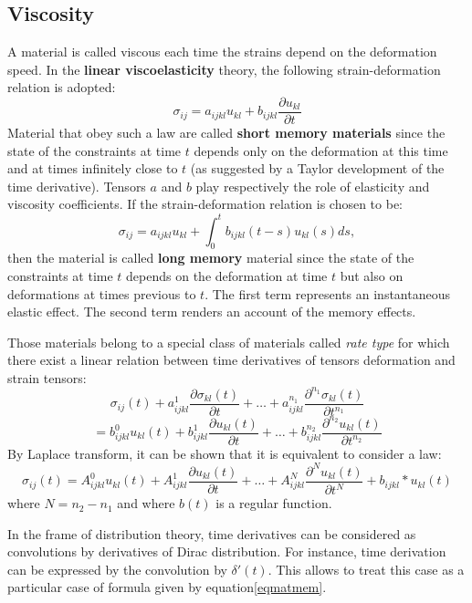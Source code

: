 \documentclass[12pt]{book}
\begin{document}
\subsection{Viscosity}
A material is called viscous
each time the strains depend
on the deformation speed. In the {\bf linear viscoelasticity}
theory\cite{ma:equad:Dautray1}, the following
strain-deformation relation is adopted:
\begin{equation}
\sigma_{ij}=a_{ijkl}u_{kl}+b_{ijkl}\frac{\partial u_{kl}}{\partial t}
\end{equation}
Material that obey such a law are called {\bf short memory
  materials}
since the state of the constraints at time $t$
depends only on the deformation at this time and at times infinitely close to
$t$ (as suggested by a Taylor development of the time derivative). Tensors $a$
and $b$ play respectively the role of elasticity and viscosity coefficients.
If the strain-deformation relation is chosen to be:
\begin{equation}\label{eqmatmem}
\sigma_{ij}=a_{ijkl}u_{kl}+\int_0^tb_{ijkl}(t-s)u_{kl}(s)ds,
\end{equation}
then the material is called {\bf long memory} material since the state of the
constraints at time $t$ depends on the deformation at time $t$ but also on
deformations at times previous to $t$.
The first term represents an instantaneous elastic effect. The second term
renders an account of the memory effects.
\begin{rem}
Those materials belong \cite{ma:equad:Duvaut72} to a special class of
materials called {\it rate type} for which there exist a linear relation
between time derivatives of tensors deformation and strain tensors:
\begin{equation}
\sigma_{ij}(t)+a^1_{ijkl}\frac{\partial \sigma_{kl}(t)}{\partial
t}+\dots+a^{n_1}_{ijkl}\frac{\partial^{n_1} \sigma_{kl}(t)}{\partial
t^{n_1}} 
\end{equation}
\begin{equation}
=b^0_{ijkl}u_{kl}(t)+b^1_{ijkl}\frac{\partial u_{kl}(t)}{\partial
t}+\dots+b^{n_2}_{ijkl}\frac{\partial^{n_2} u_{kl}(t)}{\partial
t^{n_2}} 
\end{equation}
By Laplace transform, it can be shown that it is equivalent to consider a law:
\begin{equation}
\sigma_{ij}(t)=A^0_{ijkl}u_{kl}(t)+A^1_{ijkl}\frac{\partial
u_{kl}(t)}{\partial t}+\dots+A^{N}_{ijkl}\frac{\partial^{N}
u_{kl}(t)}{\partial t^{N}}+b_{ijkl}*u_{kl}(t) 
\end{equation}
where $N=n_2-n_1$ and where $b(t)$ is a regular function.
\end{rem}
\begin{rem}
In the frame of distribution theory, time derivatives can be considered as
convolutions by derivatives of Dirac distribution. For instance, time
derivation can be expressed by the convolution by $\delta '(t)$. This allows
to treat this case as a particular case of formula given by
equation\ref{eqmatmem}. 
\end{rem}
\end{document}
